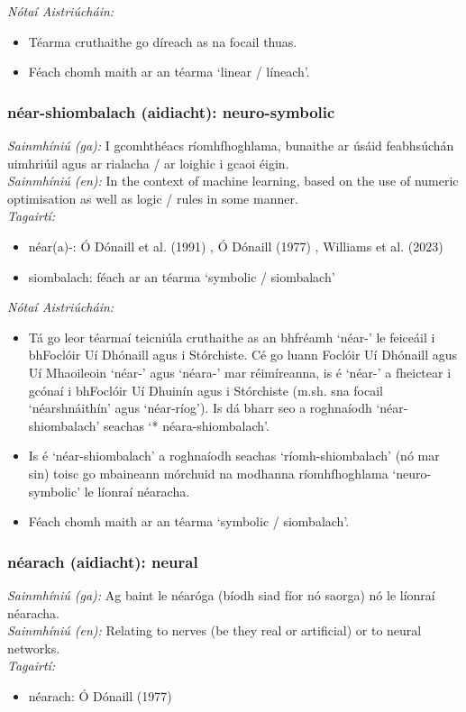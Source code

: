  \noindent \textit{Nótaí Aistriúcháin:}
\begin{itemize}
	\item Téarma cruthaithe go díreach as na focail thuas.
	\item Féach chomh maith ar an téarma `linear / líneach'.
\end{itemize}


\subsubsection*{néar-shiombalach (aidiacht): neuro-symbolic}
 \noindent \textit{Sainmhíniú (ga):} I gcomhthéacs ríomhfhoghlama, bunaithe ar úsáid feabhsúchán uimhriúil agus ar rialacha / ar loighic i gcaoi éigin.
\\
 \noindent \textit{Sainmhíniú (en):} In the context of machine learning, based on the use of numeric optimisation as well as logic / rules in some manner.
\\
 \noindent \textit{Tagairtí:}
\begin{itemize}
	\item néar(a)-: Ó Dónaill et al. (1991) \cite{focloir-beag}, Ó Dónaill (1977) \cite{odonaill}, Williams et al. (2023) \cite{storchiste}
	\item siombalach: féach ar an téarma `symbolic / siombalach'
\end{itemize}

 \noindent \textit{Nótaí Aistriúcháin:}
\begin{itemize}
	\item Tá go leor téarmaí teicniúla cruthaithe as an bhfréamh `néar-' le feiceáil i bhFoclóir Uí Dhónaill agus i Stórchiste. Cé go luann Foclóir Uí Dhónaill agus Uí Mhaoileoin `néar-' agus `néara-' mar réimíreanna, is é `néar-' a fheictear i gcónaí i bhFoclóir Uí Dhuinín agus i Stórchiste (m.sh. sna focail `néarshnáithín' agus `néar-ríog'). Is dá bharr seo a roghnaíodh `néar-shiombalach' seachas `* néara-shiombalach'.
	\item Is é `néar-shiombalach' a roghnaíodh seachas `ríomh-shiombalach' (nó mar sin) toisc go mbaineann mórchuid na modhanna ríomhfhoghlama `neuro-symbolic' le líonraí néaracha.
	\item Féach chomh maith ar an téarma `symbolic / siombalach'.
\end{itemize}


\subsubsection*{néarach (aidiacht): neural}
 \noindent \textit{Sainmhíniú (ga):} Ag baint le néaróga (bíodh siad fíor nó saorga) nó le líonraí néaracha.
\\
 \noindent \textit{Sainmhíniú (en):} Relating to nerves (be they real or artificial) or to neural networks.
\\
 \noindent \textit{Tagairtí:}
\begin{itemize}
	\item néarach: Ó Dónaill (1977) \cite{odonaill}
\end{itemize}

